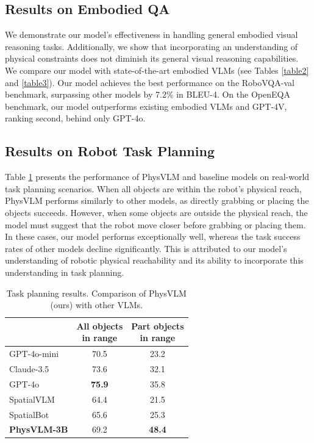 \documentclass[10pt,twocolumn,letterpaper]{article}
\begin{document}
\subsection{Results on Embodied QA}

We demonstrate our model's effectiveness in handling general embodied visual reasoning tasks. Additionally, we show that incorporating an understanding of physical constraints does not diminish its general visual reasoning capabilities. We compare our model with state-of-the-art embodied VLMs (see Tables \ref{table2} and \ref{table3}). Our model achieves the best performance on the RoboVQA-val benchmark, surpassing other models by 7.2\% in BLEU-4. On the OpenEQA benchmark, our model outperforms existing embodied VLMs and GPT-4V, ranking second, behind only GPT-4o.



\subsection{Results on Robot Task Planning}
Table \ref{table4} presents the performance of PhysVLM and baseline models on real-world task planning scenarios. When all objects are within the robot's physical reach, PhysVLM performs similarly to other models, as directly grabbing or placing the objects succeeds. However, when some objects are outside the physical reach, the model must suggest that the robot move closer before grabbing or placing them. In these cases, our model performs exceptionally well, whereas the task success rates of other models decline significantly. This is attributed to our model's understanding of robotic physical reachability and its ability to incorporate this understanding in task planning.

\begin{table}[ht]
\caption{Task planning results. Comparison of PhysVLM (ours) with other VLMs.}
\label{table4}

\begin{center}
\begin{small}
\begin{sc}
\begin{tabular}{lcc}
\toprule
 & \makecell[l]{All objects\\in range} & \makecell[l]{Part objects\\in range} \\
\midrule
GPT-4o-mini & 70.5   & 23.2  \\
Claude-3.5 & 73.6   & 32.1  \\
GPT-4o      & \textbf{75.9}   & 35.8  \\
SpatialVLM & 64.4   & 21.5  \\
SpatialBot & 65.6   & 25.3  \\
\textbf{PhysVLM-3B}    & 69.2   & \textbf{48.4} \\
\bottomrule
\end{tabular}
\end{sc}
\end{small}
\end{center}
\vskip -0.1in
\end{table}
\end{document}
